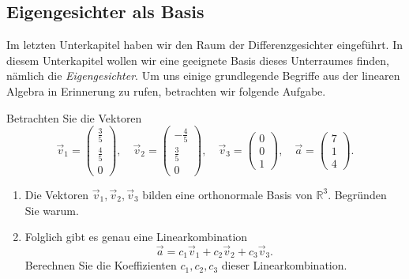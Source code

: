 \subsection{Eigengesichter als Basis}
Im letzten Unterkapitel haben wir den Raum der Differenzgesichter eingeführt.
In diesem Unterkapitel wollen wir eine geeignete Basis dieses Unterraumes finden, nämlich die \textit{Eigengesichter}.
Um uns einige grundlegende Begriffe aus der linearen Algebra in Erinnerung zu rufen, betrachten wir folgende Aufgabe.
\begin{aufgabe}
	Betrachten Sie die Vektoren
	\begin{equation*}
		\vec v_1=\begin{pmatrix}
			\tfrac{3}{5} \\ \tfrac{4}{5} \\ 0
		\end{pmatrix},\quad
		\vec v_2=\begin{pmatrix}
			-\tfrac{4}{5} \\ \tfrac{3}{5} \\  0
		\end{pmatrix},\quad
		\vec v_3=\begin{pmatrix}
			0 \\ 0 \\  1
		\end{pmatrix},\quad
		\vec a=\begin{pmatrix}
			7 \\ 1 \\  4
		\end{pmatrix}.
	\end{equation*}
	\begin{enumerate}[label=(\alph*)]
		\item Die Vektoren $\vec v_1,\vec v_2,\vec v_3$ bilden eine orthonormale Basis von $\mathbb R^3$.
		Begründen Sie warum.
		\item Folglich gibt es genau eine Linearkombination
		\begin{equation*}
			\vec a=c_1\vec v_1+c_2\vec v_2+c_3\vec v_3.
		\end{equation*}
		Berechnen Sie die Koeffizienten $c_1,c_2,c_3$ dieser Linearkombination.
	\end{enumerate}
\end{aufgabe}
